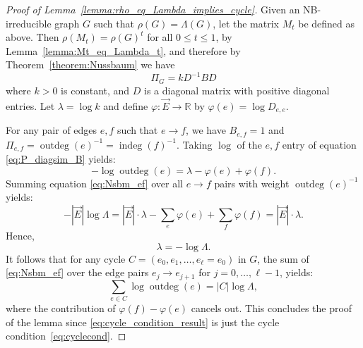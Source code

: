 \documentclass{article}
\newcommand{\dirE}{\vec{E}}
\newcommand{\R}{\mathbb{R}}  %
\DeclareMathOperator{\outdeg}{outdeg}
\DeclareMathOperator{\indeg}{indeg}
\begin{document}
\begin{proof}[Proof of Lemma~\ref{lemma:rho_eq_Lambda_implies_cycle}]
    Given an NB-irreducible graph $G$ such that  $\rho(G) = \Lambda(G)$, let the matrix $M_t$ be defined as above.
    Then $\rho(M_t)=\rho(G)^t$ for all $0 \leq t \leq 1$, by Lemma~\ref{lemma:Mt_eq_Lambda_t},
    and therefore by Theorem~\ref{theorem:Nussbaum} we have
    \begin{equation}\label{eq:P_diagsim_B}
    \Pi_G=kD^{-1}BD
    \end{equation}
    where $k>0$ is constant, and $D$ is a diagonal matrix with positive diagonal entries.
    Let $\lambda = \log k$ and define $\varphi:\dirE \to \R$ by 
    $\varphi(e) = \log D_{e,e} $.

    For any pair of edges $e,f$ such that $e \rightarrow f$, we have $B_{e,f} = 1$  and
    $\Pi _{e,f} = \outdeg(e)^{-1} = \indeg(f)^{-1}$. 
    Taking $\log$ of the $e,f$ entry of equation \eqref{eq:P_diagsim_B} yields:
    \begin{equation}\label{eq:Nsbm_ef}
        -\log\outdeg(e) = \lambda -\varphi(e)+\varphi(f).
    \end{equation}
    Summing equation \eqref{eq:Nsbm_ef} over all $e \rightarrow f$ pairs with weight $\outdeg(e)^{-1}$
    yields:
    \begin{equation}\label{eq:sum_NsbmoverEdges}
        -|\dirE| \log \Lambda = |\dirE | \cdot\lambda -\sum_{e}\varphi(e)+\sum _{f}\varphi(f) 
        = |\dirE | \cdot\lambda.
    \end{equation}
    Hence,
    \begin{equation}
        \lambda = -\log \Lambda.
    \end{equation}
    It follows that for any cycle $C=(e_0,e_1,\ldots,e_{\ell}=e_0)$ in $G$, the sum of \eqref{eq:Nsbm_ef} 
    over the edge pairs $e_j\to  e_{j+1}$ for $j=0,\ldots,\ell-1$, yields: 
    \begin{equation}\label{eq:cycle_condition_result}
        \sum_{e\in C} \log\outdeg(e) = |C| \log\Lambda, 
    \end{equation}
    where the contribution of $ \varphi(f)-\varphi(e)$ cancels out.
    This concludes the proof of the lemma since \eqref{eq:cycle_condition_result} is just the cycle condition~\eqref{eq:cyclecond}.
\end{proof}

\end{document}
